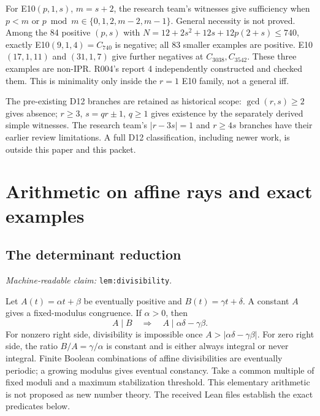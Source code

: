\documentclass[11pt]{amsart}
\newcommand{\record}[1]{\nolinkurl{#1}}
\newcommand{\claimid}[1]{\par\nopagebreak\noindent\textit{Machine-readable claim:} \record{#1}.\par}
\theoremstyle{definition}\newtheorem{definition}{Definition}
\begin{document}
For E10$(p,1,s)$, $m=s+2$, the research team's witnesses give
sufficiency when $p<m$ or
$p\bmod m\in\{0,1,2,m-2,m-1\}$. General necessity is not proved.
Among the 84 positive $(p,s)$ with
$N=12+2s^2+12s+12p(2+s)\le740$, exactly E10$(9,1,4)=C_{740}$
is negative; all 83 smaller examples are positive. E10$(17,1,11)$
and $(31,1,7)$ give further negatives at $C_{3038},C_{3542}$.
These three examples are non-IPR. R004's report 4 independently
constructed and checked them. This is minimality only inside the
$r=1$ E10 family, not a general iff.

The pre-existing D12 branches are retained as historical scope:
$\gcd(r,s)\ge2$ gives absence; $r\ge3$, $s=qr\pm1$, $q\ge1$
gives existence by the separately derived simple witnesses. The
research team's $|r-3s|=1$ and $r\ge4s$ branches have their earlier
review limitations. A full D12 classification, including newer work,
is outside this paper and this packet.

\section{Arithmetic on affine rays and exact examples}\label{sec:arithmetic}
\subsection{The determinant reduction}\label{lem:divisibility}
\claimid{lem:divisibility}
Let $A(t)=\alpha t+\beta$ be eventually positive and
$B(t)=\gamma t+\delta$. A constant $A$ gives a fixed-modulus
congruence. If $\alpha>0$, then
\begin{equation}\label{eq:determinant}
 A\mid B\quad\Longrightarrow\quad A\mid\alpha\delta-\gamma\beta.
\end{equation}
For nonzero right side, divisibility is impossible once
$A>|\alpha\delta-\gamma\beta|$. For zero right side, the ratio
$B/A=\gamma/\alpha$ is constant and is either always integral or
never integral. Finite Boolean combinations of affine divisibilities
are eventually periodic; a growing modulus gives eventual constancy.
Take a common multiple of fixed moduli and a maximum stabilization
threshold. This elementary arithmetic is not proposed as new number
theory. The received Lean files establish the exact predicates below.
\end{document}
